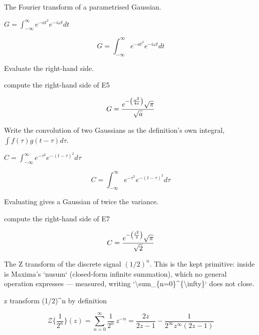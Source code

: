 \documentclass[dvipdfmx]{article}
\begin{document}
The Fourier transform of a parametrised Gaussian.

$G = \int_{-\infty}^{\infty} e^{-a t^2} e^{-i \omega t} dt$

\begin{equation}
  G = \int_{-\infty}^{\infty} e^{-a t^2} e^{-i \omega t} dt
  \label{eq:E5}
\end{equation}

Evaluate the right-hand side.

compute the right-hand side of E5

\begin{equation}
  G = {{e^ {- \left(\frac{\omega^2}{4 a}\right) } \sqrt{\pi}}\over{\sqrt{a}}}
  \label{eq:E6}
\end{equation}

Write the convolution of two Gaussians as the definition's own integral, $\int f(\tau)g(t-\tau)d\tau$.

$C = \int_{-\infty}^{\infty} e^{-\tau^2} e^{-(t-\tau)^2} d\tau$

\begin{equation}
  C = \int_{-\infty}^{\infty} e^{-\tau^2} e^{-(t-\tau)^2} d\tau
  \label{eq:E7}
\end{equation}

Evaluating gives a Gaussian of twice the variance.

compute the right-hand side of E7

\begin{equation}
  C = {{e^ {- \left(\frac{t^2}{2}\right) } \sqrt{\pi}}\over{\sqrt{2}}}
  \label{eq:E8}
\end{equation}

The Z transform of the discrete signal $(1/2)^n$. This is the kept primitive: inside is Maxima's `nusum` (closed-form infinite summation), which no general operation expresses — measured, writing `\textbackslash{}sum\_\{n=0\}\^{}\{\textbackslash{}infty\}` does not close.

z transform (1/2)\^{}n by definition

\begin{equation}
  \mathcal{Z}\{\frac{1}{2^{n}}\}(z) = \sum_{n=0}^{\infty} \frac{1}{2^{n}}\, z^{-n} = \frac{2 z}{2 z-1}-\frac{1}{2^{\infty } z^{\infty } \left(2 z-1\right)}
  \label{eq:E9}
\end{equation}
\end{document}
